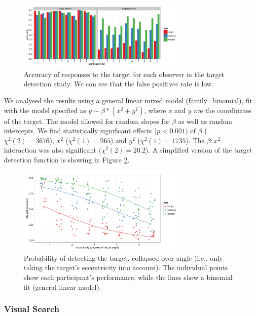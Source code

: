 \documentclass[man]{apa6}
\begin{document}
\begin{figure}
	\centering
	\includegraphics[width=8.5cm]{fig/targDet/targDetFalsePositive.pdf}
	\caption{Accuracy of responses to the target for each observer in the target detection study. We can see that the false positives rate is low.} 
	\label{fig:targDetFalsePositive}
\end{figure}

We analysed the results using a general linear mixed model (family=binomial), fit  with the model specified as $y\sim\beta*(x^2 + y^2)$, where $x$ and $y$ are the coordinates of the target. The model allowed for random slopes for $\beta$ as well as random intercepts. We find statistically significant effects ($p<0.001)$ of $\beta$ ($\chi^2(2)=3676$), $x^2$ ($\chi^2(1)=965$) and $y^2$ ($\chi^2(1)=1735$). The $\beta:x^2$ interaction was also significant ($\chi^2(2)=20.2$). A simplified version of the target detection function is showing in Figure \ref{fig:targDetEcc}.

\begin{figure}
	\centering
	\includegraphics[width=8.5cm]{fig/targDet/targDetModelEccOnly.pdf}
	\caption{Probability of detecting the target, collapsed over angle (i.e., only taking the target's eccentricity into account). The individual points show each participant's performance, while the lines show a binomial fit (general linear model).} 
	\label{fig:targDetEcc}
\end{figure}

\subsubsection{Visual Search}
\label{sec:visSearch}
\end{document}
